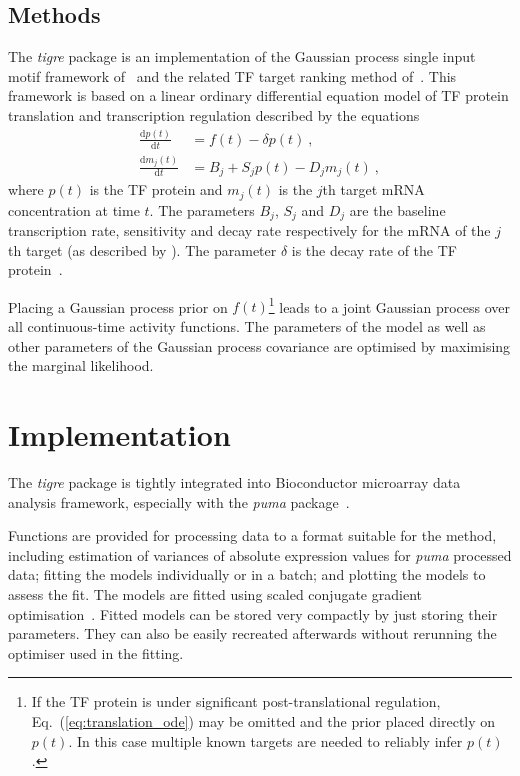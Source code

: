 \documentclass{bioinfo}
\newcommand{\tigre}{\emph{tigre}}
\begin{document}
\begin{methods}
\section{Methods}

The \tigre{} package is an implementation of the Gaussian process
single input motif framework of~\citet{Gao2008} and the related TF
target ranking method of~\citet{Honkela2010PNAS}.  This framework is
based on a linear ordinary differential equation model of TF protein
translation and transcription regulation described by the equations
\begin{align}
  \frac{\mathrm{d}p(t)}{\mathrm{d}t} & = f(t) - \delta
  p(t) \ , \label{eq:translation_ode} \\
  \frac{\mathrm{d}m_j(t)}{\mathrm{d}t} & = B_j+S_j p(t)-D_j m_j(t) \ , \label{eq:transcription_ode}
\end{align}
where $p(t)$ is the TF protein and $m_j(t)$ is the $j$th target mRNA
concentration at time $t$. The parameters $B_j$, $S_j$ and $D_j$ are the
baseline transcription rate, sensitivity and decay rate respectively
for the mRNA of the $j$th target (as described by \citet{Barenco2006a}).
The parameter $\delta$ is the decay rate of the TF
protein~\citep{Honkela2010PNAS}.

Placing a Gaussian process prior on $f(t)$\footnote{If the TF protein
  is under significant post-translational regulation,
  Eq.~(\ref{eq:translation_ode}) may be omitted and the prior placed
  directly on $p(t)$.  In this case multiple known targets are needed
  to reliably infer $p(t)$.} leads to a joint Gaussian process over
all continuous-time activity functions.  The parameters of the model
as well as other parameters of the Gaussian process covariance are
optimised by maximising the marginal likelihood.
\end{methods}

\section{Implementation}

The \tigre{} package is tightly integrated into Bioconductor
microarray data analysis framework, especially with the \emph{puma}
package~\citep{Pearson2009}.

Functions are provided for processing data to a format suitable for
the method, including estimation of variances of absolute expression
values for \emph{puma} processed data; fitting the models individually
or in a batch; and plotting the models to assess the fit.  The models
are fitted using scaled conjugate gradient
optimisation~\citep{Moller:scg93}.  Fitted models can be stored very
compactly by just storing their parameters.  They can also be easily
recreated afterwards without rerunning the optimiser used in the
fitting.
\end{document}
